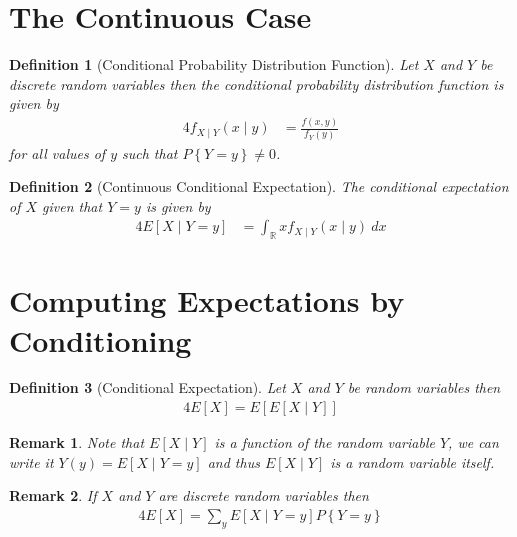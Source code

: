 \documentclass[11pt, oneside]{book}   	%
\newtheorem{definition}{Definition}[chapter]
\newtheorem{remark}{Remark}[chapter]
\newcommand{\set}[1]{\left\{#1\right\}}
\begin{document}
\section{The Continuous Case}

\begin{definition}[Conditional Probability Distribution Function]
	Let $X$ and $Y$ be discrete random variables then the \emph{conditional probability distribution function} is given by 
	\begin{alignat}{4}
		f_{X\mid Y}(x\mid y)&=\frac{f(x, y)}{f_Y(y)}
	\end{alignat}
	for all values of $y$ such that $P\set{Y=y}\neq 0$. 
\end{definition}

\begin{definition}[Continuous Conditional Expectation]
	The \emph{conditional expectation} of $X$ given that $Y=y$ is given by 
	\begin{alignat}{4}
		E[X\mid Y=y]&=\int_{\mathbb{R}}xf_{X\mid Y}(x\mid y)~dx
	\end{alignat}
\end{definition}

\section{Computing Expectations by Conditioning}

\begin{definition}[Conditional Expectation]
	Let $X$ and $Y$ be random variables then 
	\begin{alignat}{4}
		E[X]=E[E[X\mid Y]]
	\end{alignat}
\end{definition}

\begin{remark}
	Note that $E[X\mid Y]$ is a function of the random variable $Y$, we can write it $Y(y)=E[X\mid Y=y]$ and thus $E[X\mid Y]$ is a random variable itself. 
\end{remark}

\begin{remark}
	If $X$ and $Y$ are discrete random variables then 
	\begin{alignat}{4}
		E[X]=\sum_{y} E[X\mid Y=y]P\set{Y=y}
	\end{alignat}
\end{remark}
\end{document}
